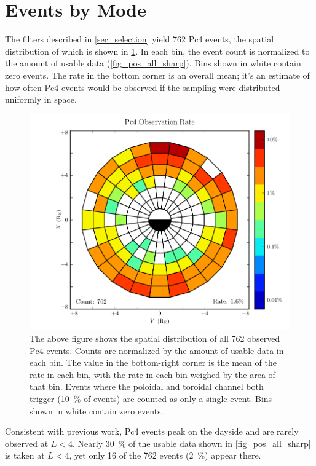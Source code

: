 \section{Events by Mode}
  \label{sec_rate}

The filters described in \cref{sec_selection} yield 762 Pc4 events, the spatial
distribution of which is shown in \cref{fig_rate_all_sharp}. In each bin, the
event count is normalized to the amount of usable data
(\cref{fig_pos_all_sharp}). Bins shown in white contain zero events. The rate
in the bottom corner is an overall mean; it's an estimate of how often Pc4
events would be observed if the sampling were distributed uniformly in space.

\begin{figure}[!htb]
  \centering
  \includegraphics[width=\textwidth]{figures/rate_all_sharp.pdf}
  \caption[Rate of Pc4 Events]{
    The above figure shows the spatial distribution of all 762 observed Pc4
    events. Counts are normalized by the amount of usable data in each bin. The
    value in the bottom-right corner is the mean of the rate in each bin, with
    the rate in each bin weighed by the area of that bin. Events where the
    poloidal and toroidal channel both trigger (\about\SI{10}{\percent} of
    events) are counted as only a single event. Bins shown in white contain
    zero events. 
  }
  \label{fig_rate_all_sharp}
\end{figure}

Consistent with previous work, Pc4 events peak on the dayside and are rarely
observed at $L < 4$. Nearly \SI{30}{\percent} of the usable data shown in
\cref{fig_pos_all_sharp} is taken at $L < 4$, yet only 16 of the 762 events
(\SI{2}{\percent}) appear there. 

